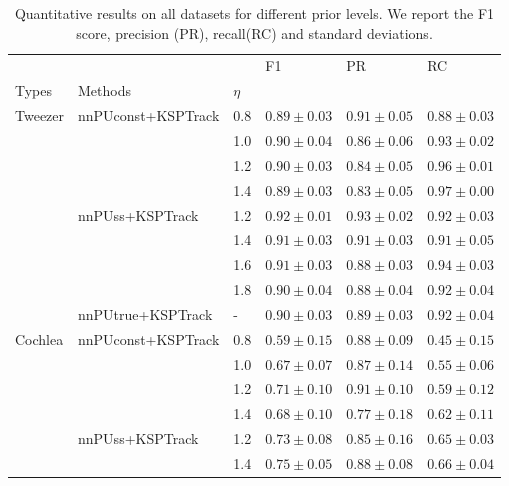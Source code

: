 \begin{table*}
\centering
\caption{
    Quantitative results on all datasets for different prior levels. We report the F1 score, precision (PR), recall(RC) and standard deviations.
    }
\label{tab:results_eta}
\begin{tabular}{llp{1.8cm}p{1.8cm}p{1.8cm}p{1.8cm}}
\toprule
      &                   &   &              F1 &              PR &              RC \\
Types & Methods & $\eta$ &                 &                 &                 \\
\midrule
\multirow{9}{*}{Tweezer} & \multirow{4}{*}{nnPUconst+KSPTrack} & 0.8 &  $0.89\pm 0.03$ &  $0.91\pm 0.05$ &  $0.88\pm 0.03$ \\
      &                   & 1.0 &  $0.90\pm 0.04$ &  $0.86\pm 0.06$ &  $0.93\pm 0.02$ \\
      &                   & 1.2 &  $0.90\pm 0.03$ &  $0.84\pm 0.05$ &  $0.96\pm 0.01$ \\
      &                   & 1.4 &  $0.89\pm 0.03$ &  $0.83\pm 0.05$ &  $0.97\pm 0.00$ \\
\cline{2-6}
      & \multirow{4}{*}{nnPUss+KSPTrack} & 1.2 &  $0.92\pm 0.01$ &  $0.93\pm 0.02$ &  $0.92\pm 0.03$ \\
      &                   & 1.4 &  $0.91\pm 0.03$ &  $0.91\pm 0.03$ &  $0.91\pm 0.05$ \\
      &                   & 1.6 &  $0.91\pm 0.03$ &  $0.88\pm 0.03$ &  $0.94\pm 0.03$ \\
      &                   & 1.8 &  $0.90\pm 0.04$ &  $0.88\pm 0.04$ &  $0.92\pm 0.04$ \\
\cline{2-6}
      & nnPUtrue+KSPTrack & - &  $0.90\pm 0.03$ &  $0.89\pm 0.03$ &  $0.92\pm 0.04$ \\
\cline{1-6}
\multirow{9}{*}{Cochlea} & \multirow{4}{*}{nnPUconst+KSPTrack} & 0.8 &  $0.59\pm 0.15$ &  $0.88\pm 0.09$ &  $0.45\pm 0.15$ \\
      &                   & 1.0 &  $0.67\pm 0.07$ &  $0.87\pm 0.14$ &  $0.55\pm 0.06$ \\
      &                   & 1.2 &  $0.71\pm 0.10$ &  $0.91\pm 0.10$ &  $0.59\pm 0.12$ \\
      &                   & 1.4 &  $0.68\pm 0.10$ &  $0.77\pm 0.18$ &  $0.62\pm 0.11$ \\
\cline{2-6}
      & \multirow{4}{*}{nnPUss+KSPTrack} & 1.2 &  $0.73\pm 0.08$ &  $0.85\pm 0.16$ &  $0.65\pm 0.03$ \\
      &                   & 1.4 &  $0.75\pm 0.05$ &  $0.88\pm 0.08$ &  $0.66\pm 0.04$ \\

\end{tabular}
\end{table*}
